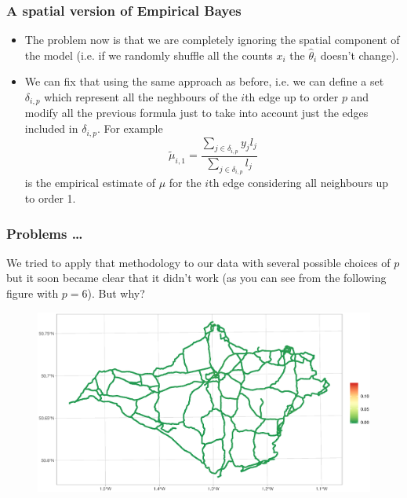 \documentclass[c,10pt,pdftex]{beamer}
\begin{document}
\begin{frame}
\frametitle{A spatial version of Empirical Bayes}
\vspace{-0.75cm}
\begin{itemize}
	\setlength\itemsep{1em}
	\item The problem now is that we are completely ignoring the spatial component of the model (i.e. if we randomly shuffle all the counts $x_i$ the $\hat{\theta}_i$ doesn't change). 
	
	\item We can fix that using the same approach as before, i.e. we can define a set $\delta_{i, p}$ which represent all the neghbours of the $i$th edge up to order $p$ and modify all the previous formula just to take into account just the edges included in $\delta_{i, p}$. For example
	\[
	\tilde{\mu}_{i, 1} = \frac{\sum_{j \in \delta_{i, p}} y_jl_j}{\sum_{j \in \delta_{i, p}} l_j}
	\]
	is the empirical estimate of $\mu$ for the $i$th edge considering all neighbours up to order 1. 
\end{itemize}
\end{frame}

\begin{frame}
\vspace{-0.25cm}
\frametitle{Problems \dots}
We tried to apply that methodology to our data with several possible choices of $p$ but it soon became clear that it didn't work (as you can see from the following figure with $p = 6$). But why?
\begin{figure}
	\centering
	\includegraphics[width=\linewidth]{images/empirical_bayes_1}
\end{figure}
\end{frame}
\end{document}

